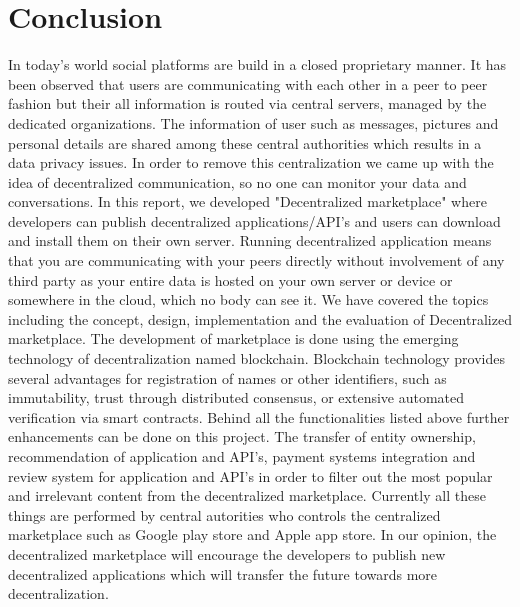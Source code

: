 \chapter{Conclusion}
\label{cha:conclusion}

In today's world social platforms are build in a closed proprietary manner. It has been observed that users are communicating with each other in a peer to peer fashion but their all information is routed via central servers, managed by the dedicated organizations. The information of user such as messages, pictures and personal details are shared among these central authorities which results in a data privacy issues. In order to remove this centralization we came up with the idea of decentralized communication, so no one can monitor your data and conversations. In this report, we developed "Decentralized marketplace" where developers can publish decentralized applications/API's and users can download and install them on their own server. Running decentralized application means that you are communicating with your peers directly without involvement of any third party as your entire data is hosted on your own server or device or somewhere in the cloud, which no body can see it. We have covered the topics including the concept, design, implementation and the evaluation of Decentralized marketplace. The development of marketplace is done using the emerging technology of decentralization named blockchain. Blockchain technology provides several advantages for registration of names or other identifiers, such as immutability, trust through distributed consensus, or extensive automated verification via smart contracts. Behind all the functionalities listed above further enhancements can be done on this project. The transfer of entity ownership, recommendation of application and API's, payment systems integration and review system for application and API's in order to filter out the most popular and irrelevant content from the decentralized marketplace. Currently all these things are performed by central autorities who controls the centralized marketplace such as Google play store and Apple app store. In our opinion, the decentralized marketplace will encourage the developers to publish new decentralized applications which will transfer the future towards more decentralization.
